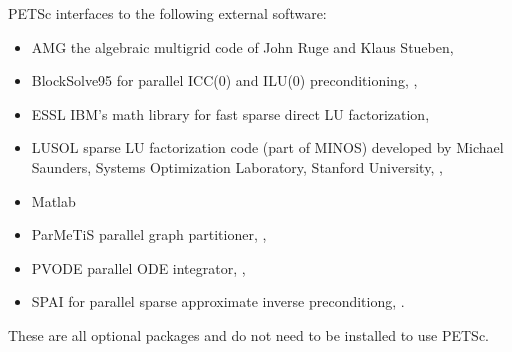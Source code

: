 \vspace{.3in}
\noindent
PETSc interfaces to the following external software:
\begin{itemize}
  \item AMG          the algebraic multigrid code of John Ruge and Klaus Stueben,
  \item BlockSolve95 for parallel ICC(0) and ILU(0) preconditioning,
                     ,
  \item ESSL         IBM's math library for fast sparse direct LU factorization,
  \item LUSOL        sparse LU factorization code (part of MINOS) developed by Michael Saunders,
                      Systems Optimization Laboratory, Stanford University,
                     ,
  \item Matlab       
  \item ParMeTiS      parallel graph partitioner, ,
  \item PVODE        parallel ODE integrator, ,
  \item SPAI         for parallel sparse approximate inverse preconditiong, 
                     .
\end{itemize}
These are all optional packages and do not need to be installed to use PETSc.


